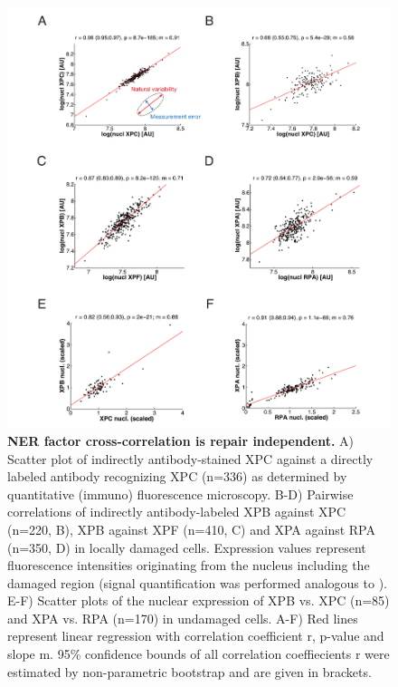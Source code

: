 \begin{figure}[htbp]
	\begin{center}
		\includegraphics[width=1\textwidth]{Abbildungen/figureTAC_2.pdf}
		\caption{\textbf{NER factor cross-correlation is repair independent.} A) Scatter plot of indirectly antibody-stained XPC against a directly labeled antibody recognizing XPC (n=336) as determined by quantitative (immuno) fluorescence microscopy. B-D) Pairwise correlations of indirectly antibody-labeled XPB against XPC (n=220, B), XPB against XPF (n=410, C) and XPA against RPA (n=350, D) in locally damaged cells. Expression values represent fluorescence intensities originating from the nucleus including the damaged region (signal quantification was performed analogous to \cite{Luijsterburg2010}). E-F) Scatter plots of the nuclear expression of XPB vs. XPC (n=85) and XPA vs. RPA (n=170) in undamaged cells. A-F) Red lines represent linear regression with correlation coefficient r, p-value and slope m. 95\% confidence bounds of all correlation coeffiecients r were estimated by non-parametric bootstrap and are given in brackets. }
		\label{fig:coExpressionData}
	\end{center}
\end{figure}



